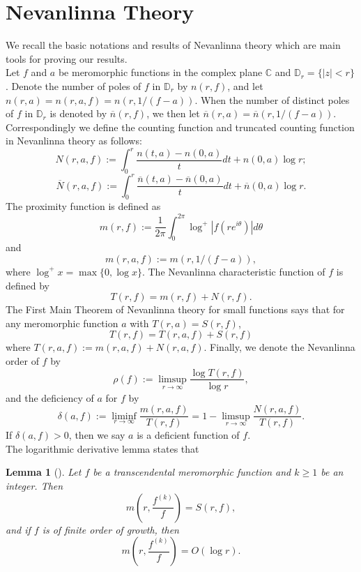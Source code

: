 \documentclass[reqno,12pt]{amsart}
\newtheorem{lem}{Lemma}
\begin{document}
\section{Nevanlinna Theory}\label{sec:N}
We recall the basic notations and results of Nevanlinna theory \cite{IIpo11} which are main tools for proving our results.\\

 Let $f$ and $a$ be meromorphic functions in the complex plane $\mathbb{C}$ and $\mathbb{D}_r=\{|z|<r\}$. Denote the number of poles of $f$ in $\mathbb{D}_r$ by $n(r, f)$, and let $n(r, a)=n(r, a, f)=n(r, 1/(f-a))$. When the number of distinct poles of $f$ in $\mathbb{D}_r$ is denoted by $\overline{n}(r, f)$, we then let $\overline{n}(r, a)=\overline{n}(r, 1/(f-a))$. Correspondingly we define the counting function and truncated counting function in Nevanlinna theory as follows: 
 $$N(r, a, f):=\displaystyle\int_0^r\dfrac{n(t, a)-n(0, a)}{t}dt+n(0,a)\log r;$$
 $$\overline{N}(r, a, f):=\displaystyle\int_0^r\dfrac{\overline{n}(t, a)-\overline{n}(0, a)}{t}dt+\overline{n}(0,a)\log r.$$
 The proximity function is defined as 
 $$m(r, f):=\dfrac{1}{2\pi}\displaystyle\int_0^{2\pi}\log^+\left|f(re^{i\theta})\right|d\theta$$ and 
 $$m(r, a, f):=m(r, 1/(f-a)),$$ where $\log^+x=\max\{0, \log x\}$. The Nevanlinna characteristic function of $f$ is defined by $$T(r, f)=m(r, f)+N(r, f).$$ The First Main Theorem of Nevanlinna theory for small functions \cite{Mohon82} says that
for any meromorphic function $a$ with $T(r,a)=S(r, f)$, $$T(r, f)=T(r, a, f)+S(r, f)$$ where $T(r, a, f):=m(r, a, f)+N(r, a, f)$.
Finally, we denote the Nevanlinna order of $f$ by $$\rho(f):=\limsup_{r\rightarrow\infty}\frac{\log T(r, f)}{\log r},$$ and the deficiency of $a$ for $f$ by $$\delta(a, f):=\liminf_{r\rightarrow\infty}\frac{m(r, a, f)}{T(r, f)}=1-\limsup_{r\rightarrow\infty}\frac{N(r, a, f)}{T(r, f)}.$$ If $\delta(a, f)>0$, then we say $a$ is a  deficient function of $f$.\\


The logarithmic derivative lemma states that 
 \begin{lem}[\cite{IIpo11}]\label{lem:LDL}
 Let $f$ be a transcendental meromorphic function and $k\geq 1$ be an integer. Then $$m\left(r, \frac{f^{(k)}}{f}\right)=S(r, f),$$ and if $f$ is of finite order of growth, then $$m\left(r, \frac{f^{(k)}}{f}\right)=O(\log r).$$
 \end{lem}
\end{document}
